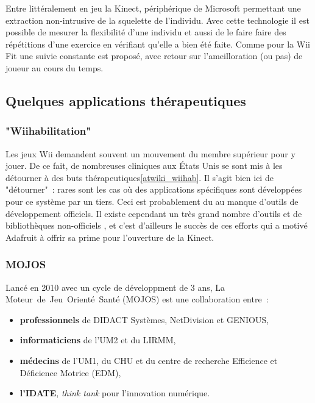Entre littéralement en jeu la Kinect, périphérique de Microsoft permettant une
extraction non-intrusive de la squelette de l'individu. Avec cette technologie
il est possible de mesurer la flexibilité d'une individu et aussi de le faire
faire des répétitions d'une exercice en vérifiant qu'elle a bien été faite. 
Comme pour la Wii Fit une suivie constante est proposé, avec retour sur
l'ameilloration (ou pas) de joueur au cours du temps.



\subsection{Quelques applications thérapeutiques}

\subsubsection{"Wiihabilitation"}

Les jeux Wii demandent souvent un mouvement du membre supérieur pour y 
jouer. De ce fait, de nombreuses 
cliniques aux États Unis se sont mis à les détourner à des buts 
thérapeutiques\ref{atwiki_wiihab}. Il s'agit bien ici de "détourner"~: rares sont les cas où des
applications spécifiques sont développées pour ce système par un tiers. Ceci
est probablement du au manque d'outils de développement officiels. Il existe
cependant un très grand nombre d'outils et de bibliothèques non-officiels
\cite{homebrew_wii}, et
c'est d'ailleurs le succès de ces efforts qui a motivé Adafruit à offrir sa prime
pour l'ouverture de la Kinect.

\subsubsection{MOJOS}
Lancé en 2010 avec un cycle de développment de 3 ans, 
La Moteur~de~Jeu~Orienté~Santé (MOJOS) est une collaboration entre~:
\begin{itemize}
\item \textbf{professionnels} de DIDACT Systèmes, NetDivision et GENIOUS,
\item \textbf{informaticiens} de l'UM2 et du LIRMM,
\item \textbf{médecins} de l'UM1, du CHU et du centre 
de recherche Efficience et Déficience Motrice (EDM),
\item \textbf{l'IDATE}, \emph{think tank} pour l'innovation numérique.
\end{itemize}\cite{mojos}

